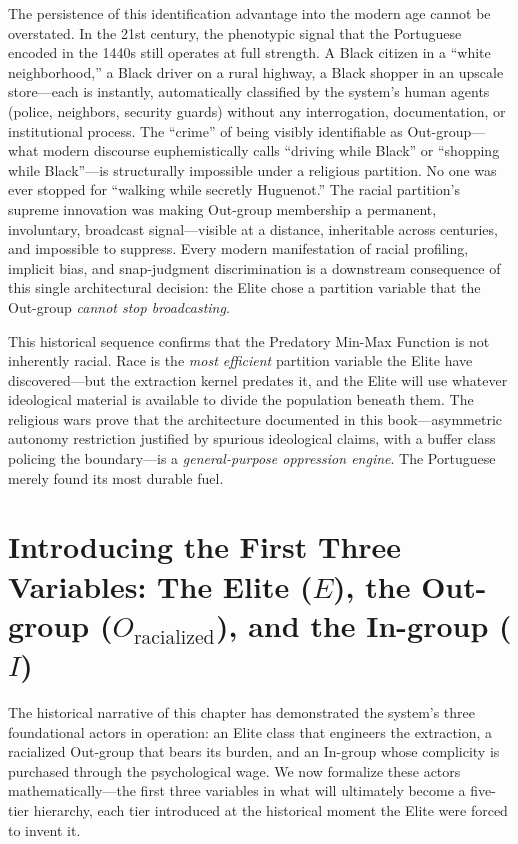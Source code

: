 \documentclass[12pt,openany]{book}
\begin{document}
The persistence of this identification advantage into the modern age cannot be overstated. In the 21st century, the phenotypic signal that the Portuguese encoded in the 1440s still operates at full strength. A Black citizen in a ``white neighborhood,'' a Black driver on a rural highway, a Black shopper in an upscale store---each is instantly, automatically classified by the system's human agents (police, neighbors, security guards) without any interrogation, documentation, or institutional process. The ``crime'' of being visibly identifiable as Out-group---what modern discourse euphemistically calls ``driving while Black'' or ``shopping while Black''---is structurally impossible under a religious partition. No one was ever stopped for ``walking while secretly Huguenot.'' The racial partition's supreme innovation was making Out-group membership a permanent, involuntary, broadcast signal---visible at a distance, inheritable across centuries, and impossible to suppress. Every modern manifestation of racial profiling, implicit bias, and snap-judgment discrimination is a downstream consequence of this single architectural decision: the Elite chose a partition variable that the Out-group \textit{cannot stop broadcasting}.

This historical sequence confirms that the Predatory Min-Max Function is not inherently racial. Race is the \textit{most efficient} partition variable the Elite have discovered---but the extraction kernel predates it, and the Elite will use whatever ideological material is available to divide the population beneath them. The religious wars prove that the architecture documented in this book---asymmetric autonomy restriction justified by spurious ideological claims, with a buffer class policing the boundary---is a \textit{general-purpose oppression engine}. The Portuguese merely found its most durable fuel.

\section{Introducing the First Three Variables: The Elite ($E$), the Out-group ($O_{\text{racialized}}$), and the In-group ($I$)}

The historical narrative of this chapter has demonstrated the system's three foundational actors in operation: an Elite class that engineers the extraction, a racialized Out-group that bears its burden, and an In-group whose complicity is purchased through the psychological wage. We now formalize these actors mathematically---the first three variables in what will ultimately become a five-tier hierarchy, each tier introduced at the historical moment the Elite were forced to invent it.
\end{document}
